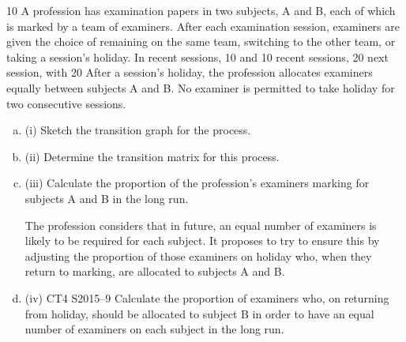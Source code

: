 \documentclass[a4paper,12pt]{article}
\begin{document}
10
A profession has examination papers in two subjects, A and B, each of which is
marked by a team of examiners. After each examination session, examiners are given
the choice of remaining on the same team, switching to the other team, or taking a
session’s holiday.
In recent sessions, 10%
and 10%
recent sessions, 20%
next session, with 20%
After a session’s holiday, the profession allocates examiners equally between subjects
A and B. No examiner is permitted to take holiday for two consecutive sessions.
\begin{enumerate}[(a)]
\item (i) Sketch the transition graph for the process. 
\item (ii) Determine the transition matrix for this process. 
\item (iii) Calculate the proportion of the profession’s examiners marking for subjects A
and B in the long run.

The profession considers that in future, an equal number of examiners is likely to be
required for each subject. It proposes to try to ensure this by adjusting the proportion
of those examiners on holiday who, when they return to marking, are allocated to
subjects A and B.
\item (iv)
CT4 S2015–9
Calculate the proportion of examiners who, on returning from holiday, should
be allocated to subject B in order to have an equal number of examiners on
each subject in the long run.
\end{enumerate}
\end{document}
